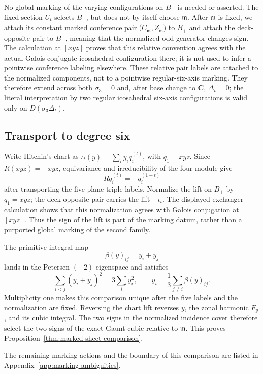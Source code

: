No global marking of the varying configurations on \(B_-\) is needed or
asserted.  The fixed section \(U_t\) selects \(B_+\), but does not by itself
choose \(\mathfrak m\).  After \(\mathfrak m\) is fixed, we attach its
constant marked conference pair
\(\bigl(C_{\mathfrak m},Z_{\mathfrak m}\bigr)\) to \(B_+\) and attach the
deck-opposite pair to \(B_-\), meaning that the normalized
odd generator changes sign.  The calculation at \([xyz]\) proves that this
relative convention agrees with the actual Galois-conjugate icosahedral configuration
there; it is not used to infer a pointwise conference labeling elsewhere.
These relative pair labels are attached to the normalized components, not
to a pointwise regular-six-axis marking.  They therefore extend across both
\(\sigma_3=0\) and, after base change to \(\mathbf C\), \(\Delta_t=0\); the
literal interpretation by two regular icosahedral six-axis configurations is
valid only on \(D(\sigma_3\Delta_t)\).

\subsection{Transport to degree six}

Write Hitchin's chart as
\(\iota_t(y)=\sum_i y_iq_i^{(t)}\), with \(q_1=xyz\).  Since
\(R(xyz)=-xyz\), equivariance and irreducibility of the four-module give
\[
 Rq_i^{(t)}=-q_i^{(1-t)}
\]
after transporting the five plane-triple labels.  Normalize the lift on
\(B_+\) by \(q_1=xyz\); the deck-opposite pair carries the lift
\(-\iota_t\).  The displayed exchanger calculation shows that this
normalization agrees with Galois conjugation at \([xyz]\).  Thus the sign of
the lift is part of the marking datum, rather than a purported global marking
of the second family.

The primitive integral map
\[
 \beta(y)_{ij}=y_i+y_j
\]
lands in the Petersen \((-2)\)-eigenspace and satisfies
\[
 \sum_{i<j}(y_i+y_j)^2=3\sum_i y_i^2,
 \qquad
 y_i=\frac13\sum_{j\ne i}\beta(y)_{ij}.
\]
Multiplicity one makes this comparison unique after the five labels and the
normalization are fixed.  Reversing the chart lift reverses \(y\), the zonal harmonic
\(F_y\), and its cubic integral.  The two signs in the normalized incidence
cover therefore select the two signs of the exact Gaunt cubic relative to
\(\mathfrak m\).  This proves Proposition~\ref{thm:marked-sheet-comparison}.

The remaining marking actions and the boundary of this comparison are listed
in Appendix~\ref{app:marking-ambiguities}.
